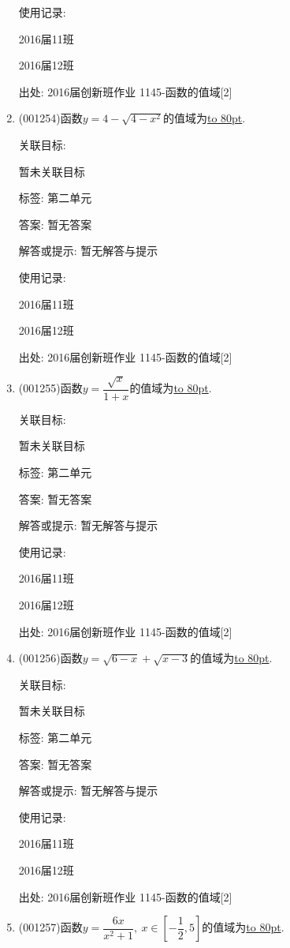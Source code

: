 \documentclass[10pt,a4paper]{article}
\newcommand{\blank}[1]{\underline{\hbox to #1pt{}}}
\begin{document}
\begin{enumerate}[1.]
使用记录:

2016届11班	

2016届12班	


出处: 2016届创新班作业	1145-函数的值域[2]
\item { (001254)}函数$y=4-\sqrt{4-x^2}$的值域为\blank{80}.


关联目标:

暂未关联目标



标签: 第二单元

答案: 暂无答案

解答或提示: 暂无解答与提示

使用记录:

2016届11班	

2016届12班	


出处: 2016届创新班作业	1145-函数的值域[2]
\item { (001255)}函数$y=\dfrac{\sqrt{x}}{1+x}$的值域为\blank{80}.


关联目标:

暂未关联目标



标签: 第二单元

答案: 暂无答案

解答或提示: 暂无解答与提示

使用记录:

2016届11班	

2016届12班	


出处: 2016届创新班作业	1145-函数的值域[2]
\item { (001256)}函数$y=\sqrt{6-x}+\sqrt{x-3}$的值域为\blank{80}.


关联目标:

暂未关联目标



标签: 第二单元

答案: 暂无答案

解答或提示: 暂无解答与提示

使用记录:

2016届11班	

2016届12班	


出处: 2016届创新班作业	1145-函数的值域[2]
\item { (001257)}函数$y=\dfrac{6x}{x^2+1}, \ x \in [-\dfrac{1}{2},5]$的值域为\blank{80}.



\end{enumerate}
\end{document}
